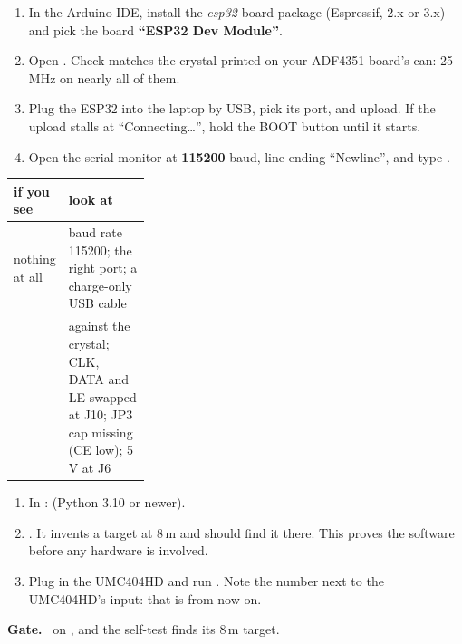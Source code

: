 \documentclass[10pt]{article}
\newcommand{\gate}[1]{\begin{okbox}\textbf{\color{okgreen!70!black}Gate.}\ #1\end{okbox}}
\begin{document}
\begin{enumerate}
  \item In the Arduino IDE, install the \emph{esp32} board package (Espressif, 2.x or 3.x) and pick the board \textbf{“ESP32 Dev Module”}.
  \item Open . Check  matches the crystal printed on your ADF4351 board's can: 25\,MHz on nearly all of them.
  \item Plug the ESP32 into the laptop by USB, pick its port, and upload. If the upload stalls at “Connecting…”, hold the BOOT button until it starts.
  \item Open the serial monitor at \textbf{115200} baud, line ending “Newline”, and type .
\end{enumerate}


{\small
\begin{tabularx}{\linewidth}{@{}P{0.3\linewidth}L@{}}
\toprule
\textbf{if you see} & \textbf{look at} \\ \midrule
nothing at all & baud rate 115200; the right port; a charge-only USB cable \\
 &  against the crystal; CLK, DATA and LE swapped at J10; JP3 cap missing (CE low); 5\,V at J6 \\
\bottomrule
\end{tabularx}}

\begin{enumerate}
  \item In :  (Python 3.10 or newer).
  \item {}. It invents a target at 8\,m and should find it there. This proves the software before any hardware is involved.
  \item Plug in the UMC404HD and run . Note the number next to the UMC404HD's input: that is  from now on.
\end{enumerate}

\gate{ on , and the self-test finds its 8\,m target.}

\newpage
\end{document}
